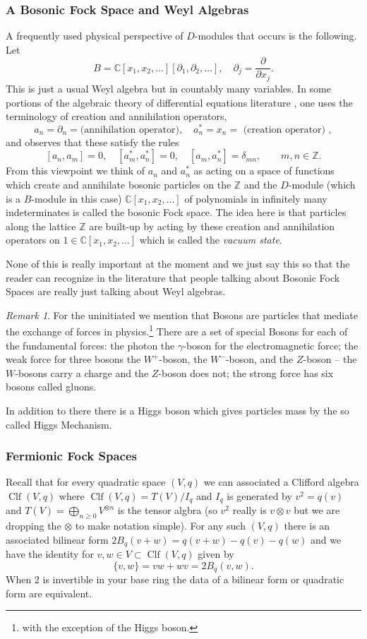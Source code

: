 \documentclass[12pt]{book}
\numberwithin{equation}{section}
\theoremstyle{definition}
\theoremstyle{remark}
\newtheorem{remark}[theorem]{Remark}
\newcommand{\ZZ}{\mathbb{Z}}
\newcommand{\CC}{\mathbb{C}}
\newcommand{\Clf}{\operatorname{Clf}}
\begin{document}
\subsubsection{A Bosonic Fock Space and Weyl Algebras}
A frequently used physical perspective of $D$-modules that occurs is the following. 
Let  
 $$ B=\CC[x_1,x_2,\ldots][\partial_1,\partial_2,\ldots], \quad \partial_j = \dfrac{\partial}{\partial x_j}.$$
This is just a usual Weyl algebra but in countably many variables. 
In some portions of the algebraic theory of differential equations literature \cite{Sato1983, Miwa2000}, one uses the terminology of creation and annihilation operators,
 $$ a_n = \partial_n =\mbox{(annihilation operator)}, \quad a_n^* = x_n = \mbox{ (creation operator) },$$
and observes that these satisfy the rules 
 $$ [a_n,a_m]=0, \quad [a_m^*,a_n^*]=0, \quad [a_m,a_n^*]= \delta_{mn}, \qquad m,n \in \ZZ.$$
From this viewpoint we think of $a_n$  and $a_n^*$ as acting on a space of functions which create and annihilate bosonic particles on the $\ZZ$ and the $D$-module (which is a $B$-module in this case) $\CC[x_1,x_2,\ldots]$ of polynomials in infinitely many indeterminates is called the bosonic Fock space. 
The idea here is that particles along the lattice $\ZZ$ are built-up by acting by these creation and annihilation operators on $1\in \CC[x_1,x_2,\ldots]$ which is called the \emph{vacuum state}.

None of this is really important at the moment and we just say this so that the reader can recognize in the literature that people talking about Bosonic Fock Spaces are really just talking about Weyl algebras. 

\begin{remark}
For the uninitiated we mention that Bosons are particles that mediate the exchange of forces in physics.\footnote{with the exception of the Higgs boson.} 
There are a set of special Bosons for each of the fundamental forces: the photon the $\gamma$-boson for the electromagnetic force; the weak force for three bosons the $W^+$-boson, the $W^-$-boson, and the $Z$-boson -- the $W$-bosons carry a charge and the $Z$-boson does not; the strong force has  six bosons called gluons.

In addition to there there is a Higgs boson which gives particles mass by the so called Higgs Mechanism.
\end{remark}


\subsubsection{Fermionic Fock Spaces}
Recall that for every quadratic space $(V,q)$ we can associated a Clifford algebra $\Clf(V,q)$ where $\Clf(V,q) = T(V)/I_q$ and $I_q$ is generated by $v^2 = q(v)$ and $T(V) = \bigoplus_{n\geq 0} V^{\otimes n}$ is the tensor algbra (so $v^2$ really is $v\otimes v$ but we are dropping the $\otimes$ to make notation simple).
For any such $(V,q)$ there is an associated bilinear form $2B_q(v+w) = q(v+w)-q(v)-q(w)$ and we have the identity for $v,w \in V \subset \Clf(V,q)$ given by 
 $$ \lbrace v,w\rbrace = vw+wv = 2B_q(v,w).$$
When $2$ is invertible in your base ring the data of a bilinear form or quadratic form are equivalent. 
\end{document}
